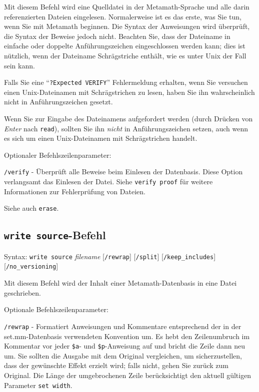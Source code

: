 Mit diesem Befehl wird eine Quelldatei in der Metamath-Sprache und alle darin referenzierten Dateien eingelesen.  Normalerweise ist es das erste, was Sie tun, wenn Sie mit Metamath beginnen. Die Syntax der Anweisungen wird überprüft, die Syntax der Beweise jedoch nicht. Beachten Sie, dass der Dateiname in einfache oder doppelte Anführungszeichen eingeschlossen werden kann; dies ist nützlich, wenn der Dateiname Schrägstriche enthält, wie es unter Unix der Fall sein kann. 

Falls Sie eine "`\texttt{?Expected VERIFY}"' Fehlermeldung erhalten, wenn Sie versuchen einen Unix-Dateinamen mit Schrägstrichen zu lesen, haben Sie ihn wahrscheinlich nicht in Anführungszeichen gesetzt.

Wenn Sie zur Eingabe des Dateinamens aufgefordert werden (durch Drücken von {\em Enter} nach \texttt{read}), sollten Sie ihn {\em nicht} in Anführungszeichen setzen, auch wenn es sich um einen Unix-Dateinamen mit Schrägstrichen handelt. 

Optionaler Befehlszeilenparameter:

    \texttt{/verify} - Überprüft alle Beweise beim Einlesen der Datenbasis.  Diese Option verlangsamt das Einlesen der Datei.  Siehe \texttt{verify proof} für weitere Informationen zur Fehlerprüfung von Dateien.

Siehe auch \texttt{erase}.


\subsection{\texttt{write source}-Befehl}

Syntax:  \texttt{write source} {\em filename}
[\texttt{/rewrap}]
[\texttt{/split}]
[\texttt{/keep\_includes}] {\\}
[\texttt{/no\_versioning}]

Mit diesem Befehl wird der Inhalt einer Metamath-Datenbasis in eine Datei geschrieben.

Optionale Befehlszeilenparameter:

\texttt{/rewrap} - Formatiert Anweisungen und Kommentare entsprechend der in der set.mm-Datenbasis verwendeten Konvention um. Es hebt den Zeilenumbruch im Kommentar vor jeder \texttt{\$a}- und \texttt{\$p}-Anweisung auf und bricht die Zeile dann neu um.  Sie sollten die Ausgabe mit dem Original vergleichen, um sicherzustellen, dass der gewünschte Effekt erzielt wird; falls nicht, gehen Sie zurück zum Original.  Die Länge der umgebrochenen Zeile berücksichtigt den aktuell gültigen Parameter \texttt{set width}.  

